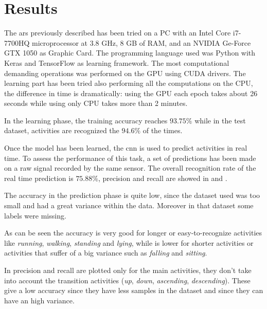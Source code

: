 
\section{Results}
\label{sec:results}

The \gls{ars} previously described has been tried on a PC with an Intel Core i7-7700HQ microprocessor at 3.8 GHz, 8 GB of RAM, and an NVIDIA Ge-Force GTX 1050 as Graphic Card. The programming language used was Python with Keras and TensorFlow as learning framework. The most computational demanding operations was performed on the GPU using CUDA drivers.
The learning part has been tried also performing all the computations on the CPU, the difference in time is dramatically: using the GPU each epoch takes about 26 seconds while using only CPU takes more than 2 minutes.

In the learning phase, the training accuracy reaches $93.75\%$ while in the test dataset, activities are recognized the $94.6\%$ of the times.

Once the model has been learned, the \gls{cnn} is used to predict activities in real time. To assess the performance of this task, a set of predictions has been made on a raw signal recorded by the same sensor. The overall recognition rate of the real time prediction is $75.88\%$, precision and recall are showed in  and .

The accuracy in the prediction phase is quite low, since the dataset used was too small and had a great variance within the data. Moreover in that dataset some labels were missing.

As can be seen the accuracy is very good for longer or easy-to-recognize activities like \textit{running}, \textit{walking}, \textit{standing} and \textit{lying}, while is lower for shorter activities or activities that suffer of a big variance such as \textit{falling} and \textit{sitting}.

In \cite{Korbinian} precision and recall are plotted only for the main activities, they don't take into account the transition activities (\textit{up}, \textit{down}, \textit{ascending}, \textit{descending}). These give a low accuracy since they have less samples in the dataset and since they can have an high variance.

